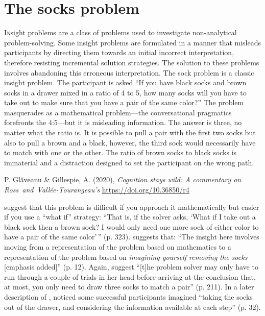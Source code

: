 \documentclass[twocolumn, issue, empirical, authordate,drafn]{jote-new-article}
\begin{document}
\section{The socks problem}

\lettrine{I}nsight problems are a class of problems used to investigate non-analytical problem-solving. Some insight problems are formulated in a manner that misleads participants by directing them towards an initial incorrect interpretation, therefore resisting incremental solution strategies. The solution to these problems involves abandoning this erroneous interpretation. The sock problem is a classic insight problem. The participant is asked ``If you have black socks and brown socks in a drawer mixed in a ratio of 4 to 5, how many socks will you have to take out to make sure that you have a pair of the same color?'' The problem masquerades as a mathematical problem---the conversational pragmatics forefronts the 4:5---but it is misleading information. The answer is three, no matter what the ratio is. It is possible to pull a pair with the first two socks but also to pull a brown and a black, however, the third sock would necessarily have to match with one or the other. The ratio of brown socks to black socks is immaterial and a distraction designed to set the participant on the wrong path. 

\begin{companion}
\selectfont

P. Glăveanu \& Gillespie, A. (2020),\vskip5pt
\emph{Cognition stays wild: A commentary on Ross~and~Vallée-Tourangeau’s} \vskip5pt \href{https://doi.org/10.36850/r4}{https://doi.org/10.36850/r4}
\end{companion}
\textcite{Bowden2005} suggest that this problem is difficult if you approach it mathematically but easier if you use a ``what if'' strategy: ``That is, if the solver asks, `What if I take out a black sock then a brown sock? I would only need one more sock of either color to have a pair of the same color'\,'' (p. 323). \textcite{Jones2003} suggests that: ``The insight here involves moving from a representation of the problem based on mathematics to a representation of the problem based on \emph{imagining yourself removing the socks} {[}emphasis added{]}'' (p. 12). Again, \textcite{Chu2011} suggest ``{[}t{]}he problem solver may only have to run through a couple of trials in her head before arriving at the conclusion that, at most, you only need to draw three socks to match a pair'' (p. 211). In a later description of \textcite{Fleck2013}, \textcite{Weisberg2015} noticed some successful participants imagined ``taking the socks out of the drawer, and considering the information available at each step'' (p. 32). 
\end{document}
